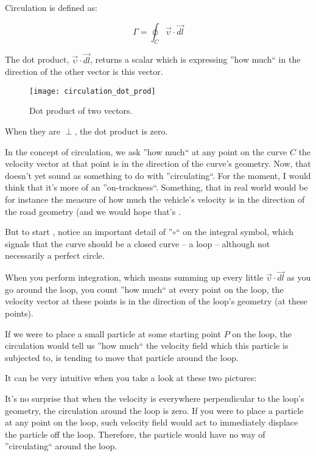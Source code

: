 

Circulation is defined as:

\begin{equation}
\Gamma = \oint_C \vec{\upsilon} \cdot \vec{dl}
\end{equation}

The dot product, $\vec{\upsilon} \cdot \vec{dl}$, returns a scalar which is expressing ''how much`` in the direction of the other vector is this vector.

\begin{figure}[H]
\centering\texttt{[image: circulation\_dot\_prod]}
\caption{Dot product of two vectors.}			
\label{fig:circulation-dot-product}
\end{figure}

When they are $\perp$, the dot product is zero.

In the concept of circulation, we ask ''how much`` at any point on the curve $C$ the velocity vector at that point is in the direction of the curve's geometry. Now, that doesn't yet sound as something to do with ''circulating``. For the moment, I would think that it's more of an ''on-trackness``. Something, that in real world would be for instance the measure of how much the vehicle's velocity is in the direction of the road geometry (and we would hope that's  .

But to start 
, notice an important detail of ''$\circ$`` on the integral symbol, which signals that the curve should be a closed curve -- a loop -- although not necessarily a perfect circle.

When you perform integration, which means summing up every little $\vec{\upsilon} \cdot \vec{dl}$ as you go around the loop, you count ''how much`` at every point on the loop, the velocity vector at these points is in the direction of the loop's geometry (at these points).

If we were to place a small particle at some starting point $P$ on the loop, the circulation would tell us ''how much`` the velocity field which this particle is subjected to, is tending to move that particle around the loop.

It can be very intuitive when you take a look at these two pictures:





It's no surprise that when the velocity is everywhere perpendicular to the loop's geometry, the circulation around the loop is zero. If you were to place a particle at any point on the loop, such velocity field would act to immediately displace the particle off the loop. Therefore, the particle would have no way of ''circulating`` around the loop.

